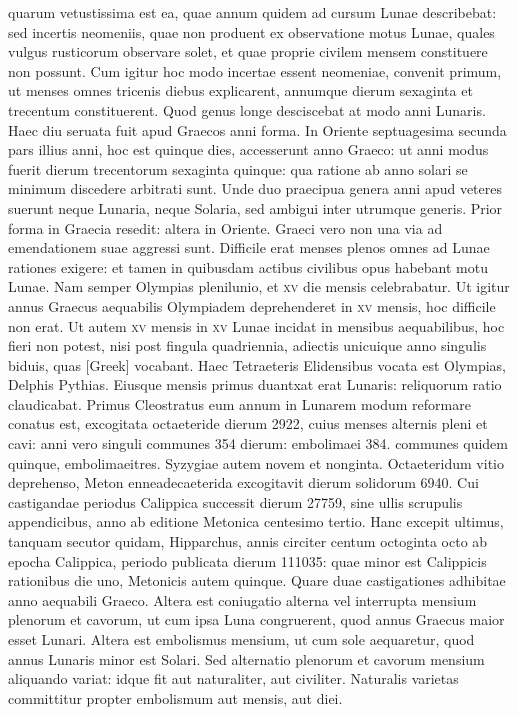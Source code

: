 quarum vetustissima est ea, quae annum quidem ad cursum
Lunae describebat:
sed incertis neomeniis, quae non produent ex observatione
motus Lunae, quales vulgus rusticorum observare solet, et
quae proprie civilem mensem constituere non possunt.
Cum igitur
hoc modo incertae essent neomeniae, convenit primum, ut menses omnes
tricenis diebus explicarent, annumque dierum sexaginta et trecentum
constituerent.
Quod genus longe desciscebat at modo anni
Lunaris.
Haec diu seruata fuit apud Graecos anni forma.
In Oriente
septuagesima secunda pars illius anni, hoc est quinque dies, accesserunt
anno Graeco: ut anni modus fuerit dierum trecentorum sexaginta quinque:
qua ratione ab anno solari se minimum discedere arbitrati sunt.
Unde duo praecipua genera anni apud veteres suerunt neque Lunaria,
neque Solaria, sed ambigui inter utrumque generis.
Prior forma in Graecia resedit: altera in Oriente.
Graeci vero non una via ad emendationem
suae aggressi sunt.
Difficile erat menses plenos omnes ad
Lunae rationes exigere: et tamen in quibusdam actibus civilibus opus
habebant motu Lunae.
Nam semper Olympias plenilunio, et \textsc{xv}
die mensis celebrabatur.
Ut igitur annus Graecus aequabilis Olympiadem
deprehenderet in \textsc{xv} mensis, hoc difficile non erat.
Ut autem
\textsc{xv} mensis in \textsc{xv}
 Lunae incidat in mensibus aequabilibus, hoc fieri non
potest, nisi post fingula quadriennia, adiectis unicuique anno singulis
biduis, quas \textgreek{[Greek]} vocabant.
Haec Tetraeteris Elidensibus
vocata est Olympias, Delphis Pythias.
Eiusque mensis primus duantxat
erat Lunaris: reliquorum ratio claudicabat.
Primus Cleostratus
eum annum in Lunarem modum reformare conatus est, excogitata
octaeteride dierum 2922, cuius menses alternis pleni et cavi: anni vero
singuli communes 354 dierum: embolimaei 384. communes quidem
quinque, embolimaeitres.
Syzygiae autem novem et nonginta.
Octaeteridum
vitio deprehenso, Meton enneadecaeterida excogitavit dierum
solidorum 6940.
Cui castigandae periodus Calippica successit dierum
27759, sine ullis scrupulis appendicibus, anno ab editione Metonica
centesimo tertio.
Hanc excepit ultimus, tanquam secutor quidam,
Hipparchus, annis circiter centum octoginta octo ab epocha Calippica,
periodo publicata dierum 111035: quae minor est Calippicis rationibus
die uno, Metonicis autem quinque.
Quare duae castigationes adhibitae
anno aequabili Graeco.
Altera est coniugatio alterna vel interrupta
mensium plenorum et cavorum, ut cum ipsa Luna congruerent, quod
annus Graecus maior esset Lunari.
Altera est embolismus mensium, ut
cum sole aequaretur, quod annus Lunaris minor est Solari.
Sed alternatio
plenorum et cavorum mensium aliquando variat: idque fit aut
naturaliter, aut civiliter.
Naturalis varietas committitur propter embolismum
aut mensis, aut diei.

